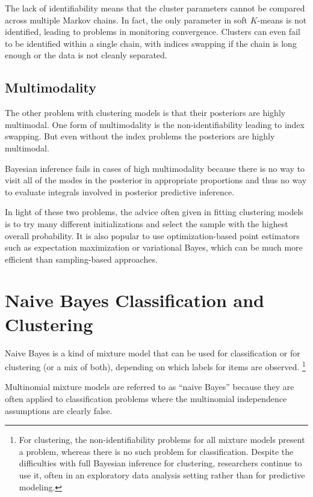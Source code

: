 The lack of identifiability means that the cluster parameters
cannot be compared across multiple Markov chains.  In fact, the only
parameter in soft $K$-means is not identified, leading to problems in
monitoring convergence.  Clusters can even fail to be identified
within a single chain, with indices swapping if the chain is long
enough or the data is not cleanly separated. 

\subsection{Multimodality}

The other problem with clustering models is that their posteriors are
highly multimodal.  One form of multimodality is the
non-identifiability leading to index swapping.  But even without
the index problems the posteriors are highly multimodal.

Bayesian inference fails in cases of high multimodality because there
is no way to visit all of the modes in the posterior in appropriate
proportions and thus no way to evaluate integrals involved in
posterior predictive inference.

In light of these two problems, the advice often given in fitting
clustering models is to try many different initializations and select
the sample with the highest overall probability.  It is also popular
to use optimization-based point estimators such as expectation
maximization or variational Bayes, which can be much more efficient
than sampling-based approaches.


\section{Naive Bayes Classification and Clustering}

Naive Bayes is a kind of mixture model that can be used for
classification or for clustering (or a mix of both), depending on
which labels for items are observed.%
%
\footnote{For clustering, the non-identifiability problems for all
  mixture models present a problem, whereas there is no such problem
  for classification.  Despite the difficulties with full Bayesian
  inference for clustering, researchers continue to use it, often in
  an exploratory data analysis setting rather than for predictive
  modeling.}

Multinomial mixture models are referred to as ``naive Bayes'' because
they are often applied to classification problems where the
multinomial independence assumptions are clearly false. 

